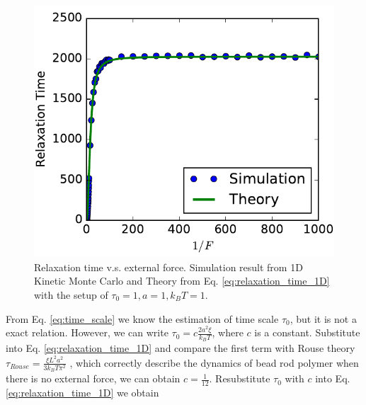 \documentclass[12pt,a4paper]{article}
\begin{document}
\begin{figure}[htpb]
    \centering
    \includegraphics[width=0.8\linewidth]{relaxation1D.pdf}
    \caption{Relaxation time v.s. external force. Simulation result from 1D
        Kinetic Monte Carlo and Theory from Eq. \eqref{eq:relaxation_time_1D}
        with the setup of $\tau_0 = 1, a=1, k_B T = 1$.}
    \label{fig:relaxation1D}
\end{figure}

From Eq. \eqref{eq:time_scale} we know the estimation of time scale $\tau_0$,
but it is not a exact relation. However, we can write $\tau_0 = c\frac{2 a^2
    \xi}{k_B T}$, where $c$ is a constant. Substitute into Eq.
\eqref{eq:relaxation_time_1D} and compare the first term with Rouse theory
$\tau_{Rouse} = \frac{\xi L^2a^2}{3k_B T \pi^2}$ \cite{},  which correctly
describe the dynamics of bead rod polymer when there is no external force, we
can obtain $c=\frac{1}{12}$. Resubstitute $\tau_0$ with $c$ into Eq.
\eqref{eq:relaxation_time_1D} we obtain
\end{document}
